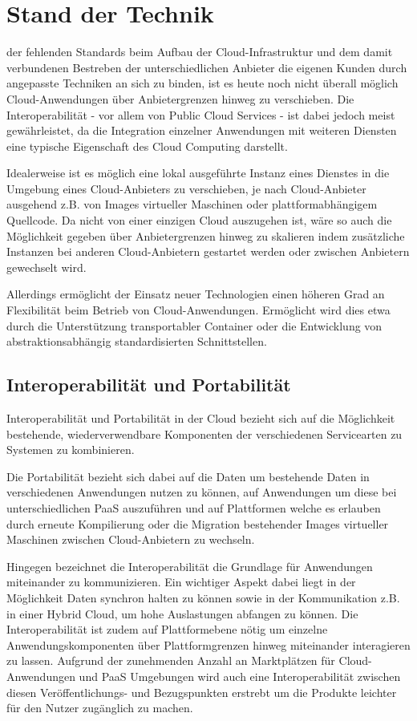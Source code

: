 \section{Stand der Technik}
\label{sec_facts}

 der fehlenden Standards beim Aufbau der Cloud-Infrastruktur und dem damit verbundenen Bestreben der unterschiedlichen Anbieter die eigenen Kunden durch angepasste Techniken an sich zu binden, ist es heute noch nicht überall möglich Cloud-Anwendungen über Anbietergrenzen hinweg zu verschieben. Die Interoperabilität - vor allem von Public Cloud Services - ist dabei jedoch meist gewährleistet, da die Integration einzelner Anwendungen mit weiteren Diensten eine typische Eigenschaft des Cloud Computing darstellt. \cite{nistStandards}

Idealerweise ist es möglich eine lokal ausgeführte Instanz eines Dienstes in die Umgebung eines Cloud-Anbieters zu verschieben, je nach Cloud-Anbieter ausgehend z.B. von Images virtueller Maschinen oder plattformabhängigem Quellcode. Da nicht von einer einzigen Cloud auszugehen ist, wäre so auch die Möglichkeit gegeben über Anbietergrenzen hinweg zu skalieren indem zusätzliche Instanzen bei anderen Cloud-Anbietern gestartet werden oder zwischen Anbietern gewechselt wird. \cite{nistStandards}

Allerdings ermöglicht der Einsatz neuer Technologien einen höheren Grad an Flexibilität beim Betrieb von Cloud-Anwendungen. Ermöglicht wird dies etwa durch die Unterstützung transportabler Container oder die Entwicklung von abstraktionsabhängig standardisierten Schnittstellen.

\subsection{Interoperabilität und Portabilität}
Interoperabilität und Portabilität in der Cloud bezieht sich auf die Möglichkeit bestehende, wiederverwendbare Komponenten der verschiedenen Servicearten zu Systemen zu kombinieren.

Die Portabilität bezieht sich dabei auf die Daten um bestehende Daten in verschiedenen Anwendungen nutzen zu können, auf Anwendungen um diese bei unterschiedlichen PaaS auszuführen und auf Plattformen welche es erlauben durch erneute Kompilierung oder die Migration bestehender Images virtueller Maschinen zwischen Cloud-Anbietern zu wechseln.

Hingegen bezeichnet die Interoperabilität die Grundlage für Anwendungen miteinander zu kommunizieren. Ein wichtiger Aspekt dabei liegt in der Möglichkeit Daten synchron halten zu können sowie in der Kommunikation z.B. in einer Hybrid Cloud, um hohe Auslastungen abfangen zu können.
Die Interoperabilität ist zudem auf Plattformebene nötig um einzelne Anwendungskomponenten über Plattformgrenzen hinweg miteinander interagieren zu lassen.
Aufgrund der zunehmenden Anzahl an Marktplätzen für Cloud-Anwendungen und PaaS Umgebungen wird auch eine Interoperabilität zwischen diesen Veröffentlichungs- und Bezugspunkten erstrebt um die Produkte leichter für den Nutzer zugänglich zu machen.

